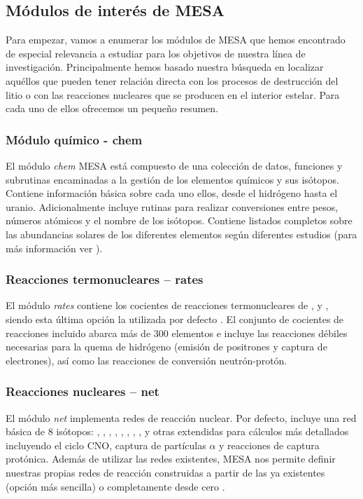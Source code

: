 \subsection{Módulos de interés de MESA}
Para empezar, vamos a enumerar los módulos de MESA que hemos encontrado de especial relevancia a estudiar para los objetivos de nuestra línea de investigación. Principalmente hemos basado nuestra búsqueda en localizar aquéllos que pueden tener relación directa con los procesos de destrucción del litio o con las reacciones nucleares que se producen en el interior estelar. Para cada uno de ellos ofrecemos un pequeño resumen.

\subsubsection{Módulo químico - chem}
El módulo \textit{chem} MESA está compuesto de una colección de datos, funciones y subrutinas encaminadas a la gestión de los elementos químicos y sus isótopos. Contiene información básica sobre cada uno ellos, desde el hidrógeno hasta el uranio. Adicionalmente incluye rutinas para realizar conversiones entre pesos, números atómicos y el nombre de los isótopos. Contiene listados completos sobre las abundancias solares de los diferentes elementos según diferentes estudios (para más información ver \cite{Paxton2011}).\par

\subsubsection{Reacciones termonucleares – rates}
El módulo \textit{rates} contiene los cocientes de reacciones termonucleares de \cite{Caughlan1988}, y \cite{Angulo1999}, siendo esta última opción la utilizada por defecto \cite{Paxton2011}. El conjunto de cocientes de reacciones incluido abarca más de 300 elementos e incluye las reacciones débiles necesarias para la quema de hidrógeno (emisión de positrones y captura de electrones), así como las reacciones de conversión neutrón-protón.

\subsubsection{Reacciones nucleares – net} \label{reac_nuc}
El módulo \textit{net} implementa redes de reacción nuclear. Por defecto, incluye una red básica de 8 isótopos: , , , , , , , , y otras extendidas para cálculos más detallados incluyendo el ciclo CNO, captura de partículas $\alpha$ y reacciones de captura protónica. Además de utilizar las redes existentes, MESA nos permite definir nuestras propias redes de reacción construidas a partir de las ya existentes (opción más sencilla) o completamente desde cero \cite{Paxton2011}.\par

